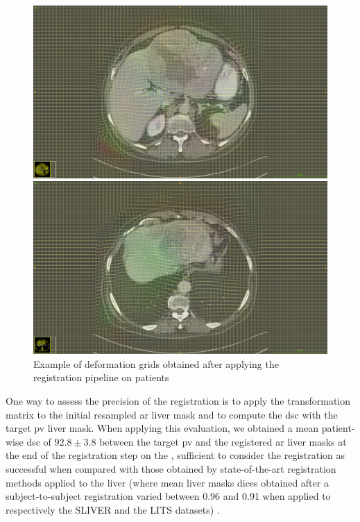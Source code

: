 \begin{figure}
\centering
\begin{minipage}{0.7\linewidth}
\includegraphics[width=\linewidth]{../HistologicalGradePrediction/images/TCIA_TCGA-DD-A11A_deformation_grid_slice49}
\end{minipage}

\vspace{0.8cm}
\begin{minipage}{0.7\linewidth}
\includegraphics[width=\linewidth]{../HistologicalGradePrediction/images/TCIA_TCGA-DD-A11A_deformation_grid_slice68}
\end{minipage}
\caption{Example of deformation grids obtained after applying the registration pipeline on  patients}
\label{fig:deformationGridExamples}
\end{figure}
One way to assess the precision of the registration is to apply the
transformation matrix to the initial resampled \ac{ar} liver mask and to
compute the \ac{dsc} with the target \ac{pv} liver mask. When applying this
evaluation, we obtained a mean patient-wise \ac{dsc} of $ 92.8 \pm 3.8 $ between the target \ac{pv} and the registered \ac{ar} liver masks at the
end of the registration step on the \textbf{}, sufficient to consider the
registration as successful when compared with those obtained by state-of-the-art
registration methods applied to the liver (where mean liver masks dices obtained after a subject-to-subject registration varied between 0.96 and 0.91 when applied to respectively the SLIVER and the LITS datasets) \cite{Zhao2019}.

